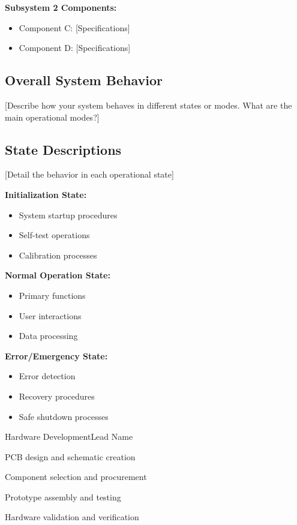 \documentclass[final]{../designreport}
\begin{document}
\textbf{Subsystem 2 Components:}
\begin{itemize}
    \item Component C: [Specifications]
    \item Component D: [Specifications]
\end{itemize}

\behavioralmodels

\subsection{Overall System Behavior}
[Describe how your system behaves in different states or modes. What are the main operational modes?]

\subsection{State Descriptions}
[Detail the behavior in each operational state]

\textbf{Initialization State:}
\begin{itemize}
    \item System startup procedures
    \item Self-test operations
    \item Calibration processes
\end{itemize}

\textbf{Normal Operation State:}
\begin{itemize}
    \item Primary functions
    \item User interactions
    \item Data processing
\end{itemize}

\textbf{Error/Emergency State:}
\begin{itemize}
    \item Error detection
    \item Recovery procedures
    \item Safe shutdown processes
\end{itemize}

\projectplan

\workbreakdown

\begin{subproject}{Hardware Development}{Lead Name}
    \item PCB design and schematic creation
    \item Component selection and procurement
    \item Prototype assembly and testing
    \item Hardware validation and verification
\end{subproject}
\end{document}
